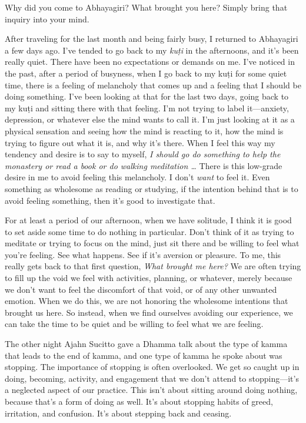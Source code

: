 
Why did you come to Abhayagiri? What brought you here? Simply bring 
that inquiry into your mind.

After traveling for the last month and being fairly busy, I returned to 
Abhayagiri a few days ago. I've tended to go back to my \emph{kuṭi} 
in the afternoons, and it's been really quiet. There have been no 
expectations or demands on me. I've noticed in the past, after a period 
of busyness, when I go back to my kuṭi for some quiet time, there is 
a feeling of melancholy that comes up and a feeling that I should be 
doing something. I've been looking at that for the last two days, going 
back to my kuṭi and sitting there with that feeling. I'm not trying 
to label it---anxiety, depression, or whatever else the mind wants to 
call it. I'm just looking at it as a physical sensation and seeing how 
the mind is reacting to it, how the mind is trying to figure out what 
it is, and why it's there. When I feel this way my tendency and desire 
is to say to myself, \emph{I should go do something to help the 
monastery or read a book or do walking meditation \ldots{}} There is 
this low-grade desire in me to avoid feeling this melancholy. I don't 
\emph{want} to feel it. Even something as wholesome as reading or 
studying, if the intention behind that is to avoid feeling something, 
then it's good to investigate that.

For at least a period of our afternoon, when we have solitude, I think 
it is good to set aside some time to do nothing in particular. Don't 
think of it as trying to meditate or trying to focus on the mind, just 
sit there and be willing to feel what you're feeling. See what happens. 
See if it's aversion or pleasure. To me, this really gets back to that 
first question, \emph{What brought me here?} We are often trying to 
fill up the void we feel with activities, planning, or whatever, merely 
because we don't want to feel the discomfort of that void, or of any 
other unwanted emotion. When we do this, we are not honoring the 
wholesome intentions that brought us here. So instead, when we find 
ourselves avoiding our experience, we can take the time to be quiet and 
be willing to feel what we are feeling.


The other night Ajahn Sucitto gave a Dhamma talk about the type of 
kamma that leads to the end of kamma, and one type of kamma he spoke 
about was stopping. The importance of stopping is often overlooked. We 
get so caught up in doing, becoming, activity, and engagement that we 
don't attend to stopping---it's a neglected aspect of our practice. 
This isn't about sitting around doing nothing, because that's a form of 
doing as well. It's about stopping habits of greed, irritation, and 
confusion. It's about stepping back and ceasing.

